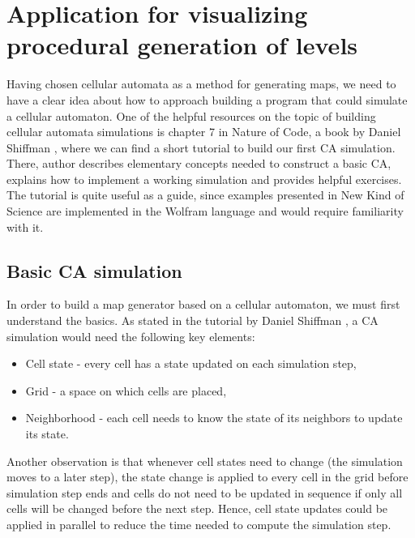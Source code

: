 \documentclass[12pt]{report}
\begin{document}
\chapter{Application for visualizing procedural generation of levels} \label{rozdzial.praktyka} 

Having chosen cellular automata as a method for generating maps, we need to have a clear idea about how to approach building a program that could simulate a cellular automaton. One of the helpful resources on the topic of building cellular automata simulations is chapter 7 in Nature of Code, a book by Daniel Shiffman \autocite{shiffman2012nature}, where we can find a short tutorial to build our first CA simulation. There, author describes elementary concepts needed to construct a basic CA, explains how to implement a working simulation and provides helpful exercises. The tutorial is quite useful as a guide, since examples presented in New Kind of Science \autocite{wolfram2002new} are implemented in the Wolfram language and would require familiarity with it.

\section{Basic CA simulation}

In order to build a map generator based on a cellular automaton, we must first understand the basics. As stated in the tutorial by Daniel Shiffman \autocite{shiffman2012nature}, a CA simulation would need the following key elements:

\begin{itemize}
	\item Cell state - every cell has a state updated on each simulation step,
	\item Grid - a space on which cells are placed,
	\item Neighborhood - each cell needs to know the state of its neighbors to update its state.
\end{itemize}

Another observation is that whenever cell states need to change (the simulation moves to a later step), the state change is applied to every cell in the grid before simulation step ends and cells do not need to be updated in sequence if only all cells will be changed before the next step. Hence, cell state updates could be applied in parallel to reduce the time needed to compute the simulation step.
\end{document}
